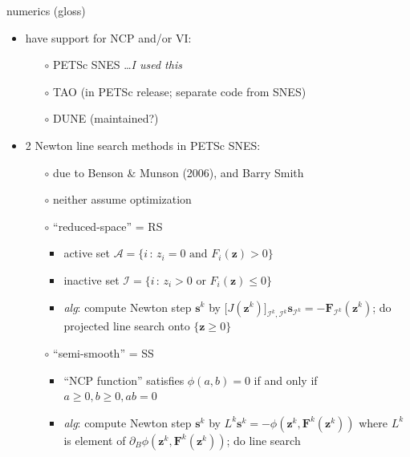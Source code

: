 \documentclass{beamer}
\newcommand\bq{\mathbf{q}}
\newcommand\bs{\mathbf{s}}
\newcommand\bx{\mathbf{x}}
\newcommand\bz{\mathbf{z}}
\newcommand\bF{\mathbf{F}}
\newcommand\Div{\nabla\cdot}
\begin{document}
\begin{frame}{numerics (gloss)}

\begin{itemize}
\item have support for NCP and/or VI:
  \begin{itemize}
  \item[$\circ$]  PETSc SNES \dots \emph{I used this}
  \item[$\circ$]  TAO (in PETSc release; separate code from SNES)
  \item[$\circ$]  DUNE (maintained?)
  \end{itemize}
\item 2 Newton line search methods in PETSc SNES:
  \begin{itemize}
  \item[$\circ$]  due to Benson \& Munson (2006), and Barry Smith
  \item[$\circ$]  neither assume optimization
  \item[$\circ$]  ``reduced-space'' = \alert{RS}
    \begin{itemize}
    \item active set $\mathcal{A} = \{i \,:\, z_i = 0 \text{ and } F_i(\bz) > 0\}$
    \item inactive set $\mathcal{I} = \{i \,:\, z_i > 0 \text{ or } F_i(\bz) \le 0\}$
    \item \emph{alg}: compute Newton step $\bs^k$ by $\big[J(\bz^k)\big]_{\mathcal{I}^k,\mathcal{I}^k} \bs_{\mathcal{I}^k} = - \bF_{\mathcal{I}^k}(\bz^k)$; do projected line search onto $\{\bz\ge 0\}$
    \end{itemize}
  \item[$\circ$]  ``semi-smooth'' = \alert{SS}
    \begin{itemize}
    \item ``NCP function'' satisfies $\phi(a,b)=0$ if and only if $a\ge 0,b\ge 0,ab=0$
    \item \emph{alg}: compute Newton step $\bs^k$ by $L^k \bs^k = - \phi(\bz^k,\bF^k(\bz^k))$ where $L^k$ is element of $\partial_B \phi(\bz^k,\bF^k(\bz^k))$; do line search
    \end{itemize}
  \end{itemize}
\end{itemize}
\end{frame}


\end{document}
